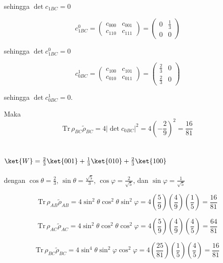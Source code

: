 sehingga $\det c_{1BC} = 0$

\begin{equation}
	c_{1BC}^0=
	\begin{pmatrix}
		c_{000} & c_{001} \\
		c_{110} & c_{111}
	\end{pmatrix}=
	\begin{pmatrix}
		0 & \frac{1}{3} \\
		0 & 0
	\end{pmatrix}
\end{equation}

sehingga $\det c_{1BC}^0 = 0$

\begin{equation}
	c_{0BC}^1=
	\begin{pmatrix}
		c_{100} & c_{101} \\
		c_{010} & c_{011}
	\end{pmatrix}=
	\begin{pmatrix}
		\frac{2}{3} & 0 \\
		\frac{2}{3} & 0
	\end{pmatrix}
\end{equation}

sehingga $\det c_{0BC}^1 = 0$.

Maka
\begin{equation}
	\mathrm{Tr}\,\rho_{BC}\tilde{\rho}_{BC}=4|\det c_{0BC}|^2=4(-\frac{2}{9})^2=\frac{16}{81}
\end{equation}

\subsection{ $\ket{W}=\frac{2}{3}\ket{001}+\frac{1}{3}\ket{010}+\frac{2}{3}\ket{100}$}
dengan $\cos\theta=\frac{2}{3}$, $\sin\theta=\frac{\sqrt{5}}{3}$, $\cos\varphi=\frac{2}{\sqrt{5}}$, dan $\sin\varphi=\frac{1}{\sqrt{5}}$

\begin{equation}
	\mathrm{Tr}\,\rho_{AB}\tilde{\rho}_{AB}=4\sin^2\theta \cos^2\theta \sin^2\varphi=4(\frac{5}{9})(\frac{4}{9})(\frac{1}{5})=\frac{16}{81}
\end{equation}

\begin{equation}
	\mathrm{Tr}\,\rho_{AC}\tilde{\rho}_{AC}=4\sin^2\theta \cos^2\theta \cos^2\varphi=4(\frac{5}{9})(\frac{4}{9})(\frac{4}{5})=\frac{64}{81}
\end{equation}

\begin{equation}
	\mathrm{Tr}\,\rho_{BC}\tilde{\rho}_{BC}=4\sin^4\theta \sin^2\varphi\cos^2\varphi=4(\frac{25}{81})(\frac{1}{5})(\frac{4}{5})=\frac{16}{81}
\end{equation}

